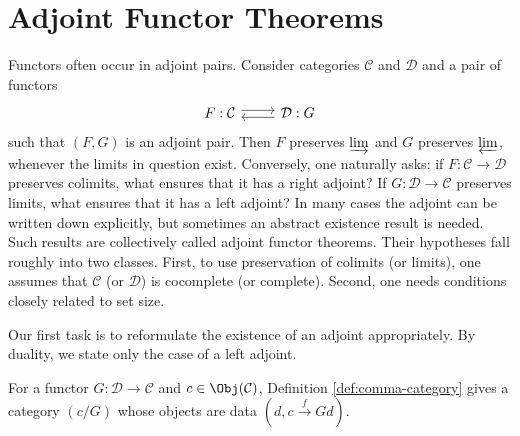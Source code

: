 
\section{Adjoint Functor Theorems}\label{sec:AFT}
\hypertarget{o014.aljabr2.chapter1.adjoint-functor-theorem}{ }

Functors often occur in adjoint pairs. Consider categories $\mathcal{C}$ and
$\mathcal{D}$ and a pair of functors
\[\begin{tikzcd}
	F: \mathcal{C} \arrow[shift left, r] & \mathcal{D}: G \arrow[shift left, l]
\end{tikzcd}\]
such that $(F,G)$ is an adjoint pair. Then $F$ preserves $\varinjlim$ and $G$
preserves $\varprojlim$, whenever the limits in question exist. Conversely,
one naturally asks: if $F:\mathcal{C}\to\mathcal{D}$ preserves colimits,
what ensures that it has a right adjoint? If
$G:\mathcal{D}\to\mathcal{C}$ preserves limits, what ensures that it has a
left adjoint? In many cases the adjoint can be written down explicitly, but
sometimes an abstract existence result is needed. Such results are
collectively called adjoint functor theorems. Their hypotheses fall roughly
into two classes. First, to use preservation of colimits (or limits), one
assumes that $\mathcal{C}$ (or $\mathcal{D}$) is cocomplete (or complete).
Second, one needs conditions closely related to set size.

Our first task is to reformulate the existence of an adjoint appropriately.
By duality, we state only the case of a left adjoint.

For a functor $G:\mathcal{D}\to\mathcal{C}$ and
$c\in\Obj(\mathcal{C})$, Definition \ref{def:comma-category} gives a
category $(c/G)$ whose objects are data $(d,c\xrightarrow{f}Gd)$.

